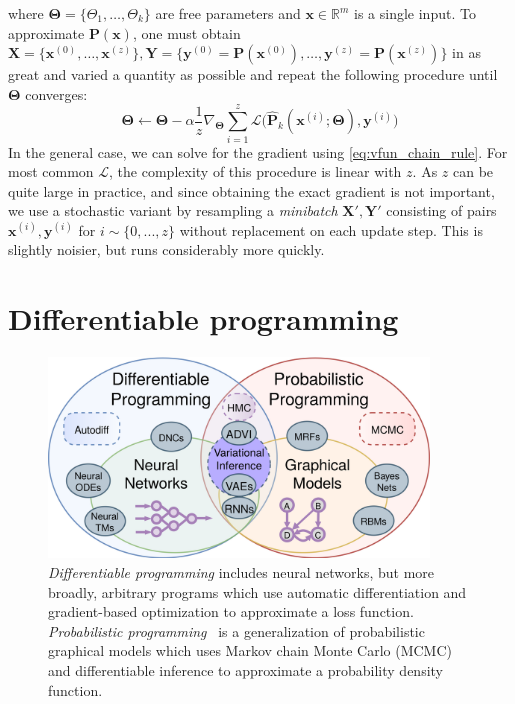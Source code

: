 \documentclass[12pt,initial,twoside,maitrise]{dms}
\numberwithin{equation}{section}
\numberwithin{table}{chapter}
\numberwithin{figure}{chapter}
\begin{document}
%
where $\bm\Theta = \{\Theta_1, \dots, \Theta_k\}$ are free parameters and $\mathbf{x} \in \mathbb{R}^m$ is a single input. To approximate $\mathbf{P}(\mathbf x)$, one must obtain $\mathbf{X} = \{\mathbf{x}^{(0)}, \dots, \mathbf{x}^{(z)}\}, \mathbf{Y} = \{\mathbf{y}^{(0)} = \mathbf{P}(\mathbf{x}^{(0)}), \dots, \mathbf{y}^{(z)} = \mathbf{P}(\mathbf{x}^{(z)})\}$ in as great and varied a quantity as possible and repeat the following procedure until $\bm\Theta$ converges:
%
\begin{equation} \label{eq:stochastic_grad_descent}
    \bm\Theta \leftarrow \bm\Theta - \alpha\frac{1}{z}\nabla_{\bm\Theta} \sum_{i=1}^z\mathcal{L}\big(\mathbf{\hat P}_k(\mathbf{x}^{(i)}; \bm\Theta), \mathbf{y}^{(i)}\big)
\end{equation}
%
In the general case, we can solve for the gradient using \autoref{eq:vfun_chain_rule}. For most common $\mathcal{L}$, the complexity of this procedure is linear with $z$. As $z$ can be quite large in practice, and since obtaining the exact gradient is not important, we use a stochastic variant by resampling a \textit{minibatch} $\mathbf{X}', \mathbf{Y}'$ consisting of pairs $\mathbf{x}^{(i)}, \mathbf{y}^{(i)}$ for $i \sim \{0, ..., z\}$ without replacement on each update step. This is slightly noisier, but runs considerably more quickly.

\section{Differentiable programming}\label{sec:differentiable-programming}

\begin{figure}
    \centering
    \includegraphics[width=0.90\textwidth]{../figures/diff_prob_prog.png}
    \caption{\textit{Differentiable programming} includes neural networks, but more broadly, arbitrary programs which use automatic differentiation and gradient-based optimization to approximate a loss function. \textit{Probabilistic programming}~\citep{carpenter2017stan, gorinova2018slicstan} is a generalization of probabilistic graphical models which uses Markov chain Monte Carlo (MCMC) and differentiable inference to approximate a probability density function.}
    \label{fig:diff_prob_prog}
\end{figure}
\end{document}
